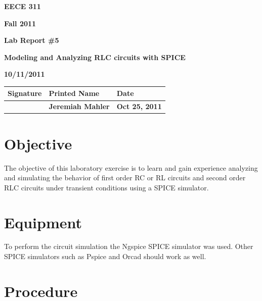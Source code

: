 \documentclass{article}
\begin{document}

\null
\thispagestyle{empty}
\vspace{1in}
\centerline{\bf EECE 311}
\centerline{\bf Fall 2011}
\centerline{\bf}
\centerline{\bf Lab Report \#5}
\centerline{\bf Modeling and Analyzing RLC circuits with SPICE}
\centerline{\bf 10/11/2011}  %

\vspace{0.5in}
\begin{center}
\begin{tabularx}{\textwidth}[b]{X l l}
Signature & Printed Name & Date \\
\hline
\multicolumn{1}{|X|}{} & \multicolumn{1}{|l|}{\bigstrut \bf Jeremiah Mahler} & \multicolumn{1}{|l|}{\bf Oct 25, 2011} \\
\hline
\end{tabularx}
\end{center}


\vfill
\pagebreak

\tableofcontents

\pagebreak

\section{Objective}

The objective of this laboratory exercise is to learn and gain
experience analyzing and simulating the behavior of first
order RC or RL circuits and second order RLC circuits under transient
conditions using a SPICE simulator.


\section{Equipment}

To perform the circuit simulation the Ngspice\cite{NGSPICE} SPICE\cite{wiki:SPICE} simulator was used.
Other SPICE simulators such as Pspice\cite{wiki:Pspice} and Orcad\cite{ORCAD}
should work as well.


\section{Procedure}
\end{document}
